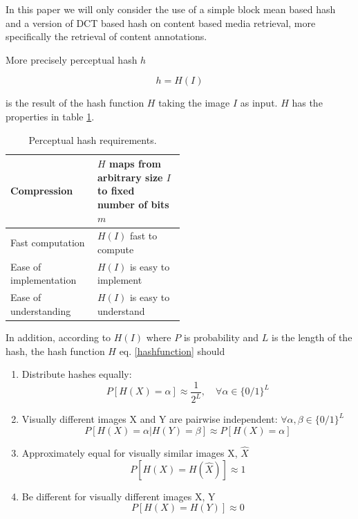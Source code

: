 \documentclass[english,12pt,a4paper,pdftex,elec,utf8]{aaltothesis}
\begin{document}
In this paper we will only consider the use of a simple block mean based hash and a version of DCT based hash on content based media retrieval, more specifically the retrieval of content annotations.

More precisely perceptual hash $h$

\begin{equation}\label{hashfunction}
h = H(I)
\end{equation}

is the result of the hash function $H$ taking the image $I$ as input. $H$ has the properties in table \ref{hashcriteria}.

\def\arraystretch{1.5}
\begin{table}[htb]
\caption{Perceptual hash requirements. \cite{Zauner2010}}
\label{hashcriteria}
\begin{center}
\begin{tabular}{lp{0.5\linewidth}}
  \hline \hline
  Compression & $H$ maps from arbitrary size $I$ to fixed number of bits $m$\\
  \hline
  Fast computation & $H(I)$ fast to compute \\
  \hline
  Ease of implementation & $H(I)$ is easy to implement\\
  \hline
  Ease of understanding & $H(I)$ is easy to understand\\
  \hline
\end{tabular}
\end{center}\end{table}


In addition, according to \cite{mihccak2001new} $H(I)$ where $P$ is probability and $L$ is the length of the hash, the hash function $H$ eq. \ref{hashfunction} should
\begin{enumerate}
\item Distribute hashes equally:\\
  \begin{equation}\label{phashdistribute}
  P[H(X)=\alpha]\approx\frac{1}{2^L},\quad\forall\alpha\in \{0/1\}^L
  \end{equation}
\item Visually different images X and Y are pairwise independent: $\forall\alpha,\beta\in\{0/1\}^L$\\
  \begin{equation}\label{phashindependent}
    P[H(X)=\alpha|H(Y)=\beta]\approx P[H(X)=\alpha]
  \end{equation}
\item Approximately equal for visually similar images X, $\hat{X}$\\
  \begin{equation}\label{phashsame}
    P[H(X) = H(\hat{X})] \approx 1
  \end{equation}

\item Be different for visually different images X, Y\\
  \begin{equation}\label{phashdif}
    P[H(X)=H(Y)]\approx 0
  \end{equation}
\end{enumerate}
\end{document}
